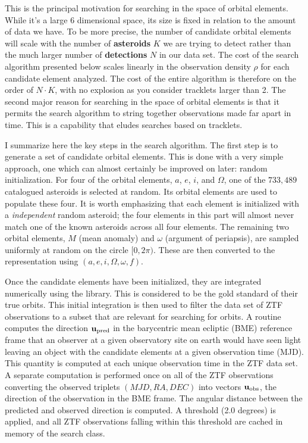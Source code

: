 This is the principal motivation for searching in the space of orbital elements.
While it's a large 6 dimensional space, its size is fixed in relation to the amount of data we have.
To be more precise, the number of candidate orbital elements will scale with the number of \textbf{asteroids} $K$ we are trying to detect
rather than the much larger number of \textbf{detections} $N$ in our data set.
The cost of the search algorithm presented below scales linearly in the observation density $\rho$ for each candidate element analyzed.
The cost of the entire algorithm is therefore on the order of $N \cdot K$, with no explosion as you consider tracklets larger than 2.
The second major reason for searching in the space of orbital elements is that it permits the search algorithm to string together observations made far apart in time.
This is a capability that eludes searches based on tracklets.

I summarize here the key steps in the search algorithm.
The first step is to generate a set of candidate orbital elements.
This is done with a very simple approach, one which can almost certainly be improved on later: random initialization.
For four of the orbital elements, $a$, $e$, $i$, and $\Omega$, one of the $733,489$ catalogued asteroids is selected at random.
Its orbital elements are used to populate these four.
It is worth emphasizing that each element is initialized with a \textit{independent} random asteroid;
the four elements in this part will almost never match one of the known asteroids across all four elements.
The remaining two orbital elements, $M$ (mean anomaly) and $\omega$ (argument of periapsis), 
are sampled uniformly at random on the circle $[0, 2 \pi)$.
These are then converted to the representation using $(a, e, i, \Omega, \omega, f)$.

Once the candidate elements have been initialized, they are integrated numerically using the  library.
This is considered to be the gold standard of their true orbits.
This initial integration is then used to filter the data set of ZTF observations to a subset that are relevant for searching for orbits.
A routine computes the direction $\mathbf{u}_{\mathrm{pred}}$ in the barycentric mean ecliptic (BME) reference frame
that an observer at a given observatory site on earth would have seen light leaving an object with the candidate elements at a given observation time (MJD).
This quantity is computed at each unique observation time in the ZTF data set.
A separate computation is performed once on all of the ZTF observations converting the observed triplets $(MJD, RA, DEC)$
into vectors $\mathbf{u}_{\mathrm{obs}}$, the direction of the observation in the BME frame.
The angular distance between the predicted and observed direction is computed.
A threshold (2.0 degrees) is applied, and all ZTF observations falling within this threshold are cached in memory of the search class.

